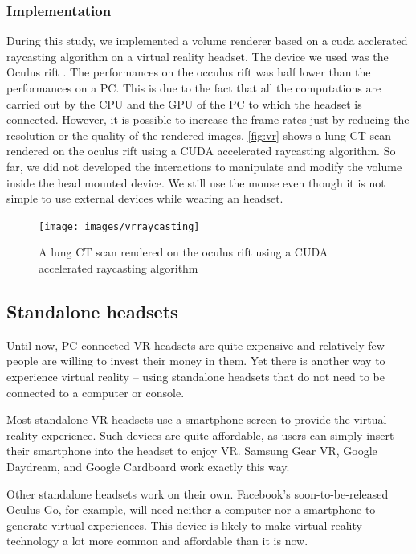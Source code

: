 \subsubsection{Implementation}

During this study, we implemented a volume renderer based on a cuda acclerated raycasting algorithm on a virtual reality headset. The device we used was the Oculus rift \cite{oculus}. The performances on the occulus rift was half lower than the performances on a PC. This is due to the fact that all the computations are carried out by the CPU and the GPU of the PC to which the headset is connected.  However, it is possible to increase the frame rates just by reducing the resolution or the quality of the rendered images. \autoref{fig:vr} shows a lung  CT scan rendered on the oculus rift using a CUDA accelerated raycasting algorithm. So far, we did not developed the interactions to manipulate and modify the volume inside the head mounted device. We still use the mouse even though it is not simple to use external devices while wearing an headset.


\begin{figure}
\centering
\texttt{[image: images/vrraycasting]}
\caption{A lung CT scan rendered on the oculus rift using a CUDA accelerated raycasting algorithm }
\label{fig:vr}
\end{figure}



\subsection{Standalone headsets}

Until now, PC-connected VR headsets are quite expensive and relatively few people are willing to invest their money in them. Yet there is another way to experience virtual reality – using standalone headsets that do not need to be connected to a computer or console.

Most standalone VR headsets use a smartphone screen to provide the virtual reality experience. Such devices are quite affordable, as users can simply insert their smartphone into the headset to enjoy VR. Samsung Gear VR, Google Daydream, and Google Cardboard work exactly this way.

Other standalone headsets work on their own. Facebook's soon-to-be-released Oculus Go, for example, will need neither a computer nor a smartphone to generate virtual experiences. This device is likely to make virtual reality technology a lot more common and affordable than it is now.

